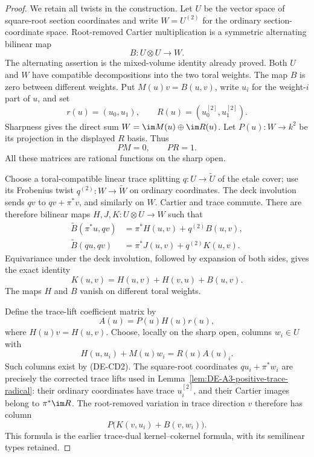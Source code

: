\begin{proof}
We retain all twists in the construction. Let $U$ be the vector space
of square-root section coordinates and write $W=U^{(2)}$ for the
ordinary section-coordinate space. Root-removed Cartier multiplication
is a symmetric alternating bilinear map
\[
             B:U\otimes U\longrightarrow W.
\]
The alternating assertion is the mixed-volume identity already proved.
Both $U$ and $W$ have compatible decompositions into the two toral
weights. The map $B$ is zero between different weights. Put
$M(u)v=B(u,v)$, write $u_i$ for the weight-$i$ part of $u$, and set
\[
 r(u)=(u_0,u_1),\qquad R(u)=(u_0^{[2]},u_1^{[2]}).
\]
Sharpness gives the direct sum $W=\im M(u)\oplus\im R(u)$.
Let $P(u):W\to k^2$ be its projection in the displayed $R$ basis.
Thus
\[
                       PM=0,\qquad PR=1.                \tag{DE-CD2}
\]
All these matrices are rational functions on the sharp open.

Choose a toral-compatible linear trace splitting
$q:U\to\widetilde U$ of the etale cover; use its Frobenius twist
$q^{(2)}:W\to\widetilde W$ on ordinary coordinates. The deck
involution sends $qv$ to $qv+\pi^*v$, and similarly on $W$.
Cartier and trace commute. There are therefore bilinear maps
$H,J,K:U\otimes U\to W$ such that
\[
 \begin{aligned}
 \widetilde B(\pi^*u,qv)&=\pi^*H(u,v)+q^{(2)}B(u,v),\\
 \widetilde B(qu,qv)&=\pi^*J(u,v)+q^{(2)}K(u,v).
 \end{aligned}
                                                        \tag{DE-CD3}
\]
Equivariance under the deck involution, followed by expansion of
both sides, gives the exact identity
\[
                  K(u,v)=H(u,v)+H(v,u)+B(u,v).            \tag{DE-CD4}
\]
The maps $H$ and $B$ vanish on different toral weights.

Define the trace-lift coefficient matrix by
\[
                          A(u)=P(u)H(u)r(u),
                                                        \tag{DE-CD5}
\]
where $H(u)v=H(u,v)$. Choose, locally on the sharp open, columns
$w_i\in U$ with
\[
                 H(u,u_i)+M(u)w_i=R(u)A(u)_i.            \tag{DE-CD6}
\]
Such columns exist by (DE-CD2). The square-root coordinates
$q u_i+\pi^*w_i$ are precisely the corrected trace lifts used in
Lemma~\ref{lem:DE-A3-positive-trace-radical}: their ordinary
coordinates have trace $u_i^{[2]}$, and their Cartier images belong
to $\pi^*\im R$. The root-removed variation in trace direction $v$
therefore has column
\[
                  P\bigl(K(v,u_i)+B(v,w_i)\bigr).
                                                        \tag{DE-CD7}
\]
This formula is the earlier trace-dual kernel--cokernel formula,
with its semilinear types retained.


\end{proof}
